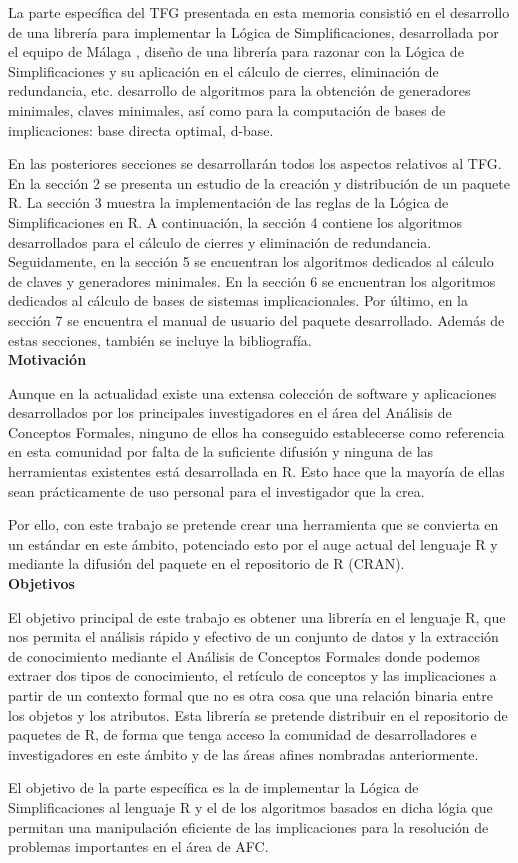 La parte espec\'ifica del TFG presentada en esta memoria consisti\'o en el desarrollo de una librer\'ia para implementar la L\'ogica de Simplificaciones, desarrollada por el equipo de M\'alaga \cite{Cordero2002}, dise\~no de una librer\'ia para razonar con la L\'ogica de Simplificaciones y su aplicaci\'on en el c\'alculo de cierres, eliminaci\'on de redundancia, etc. desarrollo de algoritmos para la obtenci\'on de generadores minimales, claves minimales, as\'i como para la computaci\'on de bases de implicaciones: base directa optimal, d-base. 

En las posteriores secciones se desarrollar\'an todos los aspectos relativos al TFG. En la secci\'on 2 se presenta un estudio de la creaci\'on y distribuci\'on de un paquete R. La secci\'on 3 muestra la implementaci\'on de las reglas de la L\'ogica de Simplificaciones en R. A continuaci\'on, la secci\'on 4 contiene los algoritmos desarrollados para el c\'alculo de cierres y eliminaci\'on de redundancia. Seguidamente, en la secci\'on 5 se encuentran los algoritmos dedicados al c\'alculo de claves y generadores minimales. En la secci\'on 6 se encuentran los algoritmos dedicados al c\'alculo de bases de sistemas implicacionales. Por \'ultimo, en la secci\'on 7 se encuentra el manual de usuario del paquete desarrollado. Adem\'as de estas secciones, tambi\'en se incluye la bibliograf\'ia.\\

\textbf{Motivaci\'on}

Aunque en la actualidad existe una extensa colecci\'on de software y aplicaciones desarrollados por los principales investigadores en el \'area del  An\'alisis de Conceptos Formales, ninguno de ellos ha conseguido establecerse como referencia en esta comunidad por falta de la suficiente difusi\'on y ninguna de las herramientas existentes est\'a desarrollada en R. Esto hace que la mayor\'ia de ellas sean pr\'acticamente de uso personal para el investigador que la crea. 

Por ello, con este trabajo se pretende crear una herramienta que se convierta en un est\'andar en este \'ambito, potenciado esto por el auge actual del lenguaje R y mediante la difusi\'on del paquete en el repositorio de R (CRAN).\\


\textbf{Objetivos}

El objetivo principal de este trabajo es obtener una librer\'ia en el lenguaje R, que nos permita el an\'alisis r\'apido y efectivo de un conjunto de datos y la extracci\'on de conocimiento mediante el An\'alisis de Conceptos Formales donde podemos extraer dos tipos de conocimiento, el ret\'iculo de conceptos y las implicaciones a partir de un contexto formal que no es otra cosa que una relaci\'on binaria entre los objetos y los atributos. Esta librer\'ia se pretende distribuir en el repositorio de paquetes de R, de forma que tenga acceso la comunidad de desarrolladores e investigadores en este \'ambito y de las \'areas afines nombradas anteriormente. 

El objetivo de la parte espec\'ifica es la de implementar la L\'ogica de Simplificaciones al lenguaje R y el de los algoritmos basados en dicha l\'ogia que permitan una manipulaci\'on eficiente de las implicaciones para la resoluci\'on de problemas importantes en el \'area de AFC.

\newpage